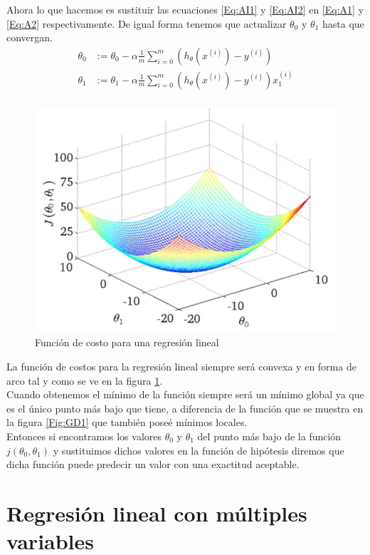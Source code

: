 \documentclass{book}
\begin{document}
Ahora lo que hacemos es sustituir las ecuaciones \ref{Eq:AI1} y \ref{Eq:AI2} en \ref{Eq:A1} y \ref{Eq:A2} respectivamente. De igual forma tenemos que actualizar $\theta_0$ y $\theta_1$ hasta que convergan.
\begin{align}
	\theta_0&:=\theta_0-\alpha\frac{1}{m}\sum_{i=0}^{m}(h_\theta(x^{(i)})-y^{(i)})\label{Eq:AI2-1}\\
	\theta_1&:=\theta_1-\alpha\frac{1}{m}\sum_{i=0}^{m}(h_\theta(x^{(i)})-y^{(i)})x_1^{(i)}\label{Eq:AI2-2}\\
\end{align}
\begin{figure}
	\includegraphics[scale=0.31]{img/CF-RL}
	\caption{Función de costo para una regresión lineal}
	\label{Fig:CFRL}
\end{figure}
La función de costos para la regresión lineal siempre será convexa y en forma de arco tal y como se ve en la figura \ref{Fig:CFRL}.\\
Cuando obtenemos el mínimo de la función siempre será un mínimo global ya que es el único punto más bajo que tiene, a diferencia de la función que se muestra en la figura \ref{Fig:GD1} que también poseé mínimos locales.\\Entonces si encontramos los valores $\theta_0$ y $\theta_1$ del punto más bajo de la función $j(\theta_0, \theta_1)$ y sustituimos dichos valores en la función de hipótesis diremos que dicha función puede predecir un valor con una exactitud aceptable. 
\chapter{Regresión lineal con múltiples variables}
\end{document}
